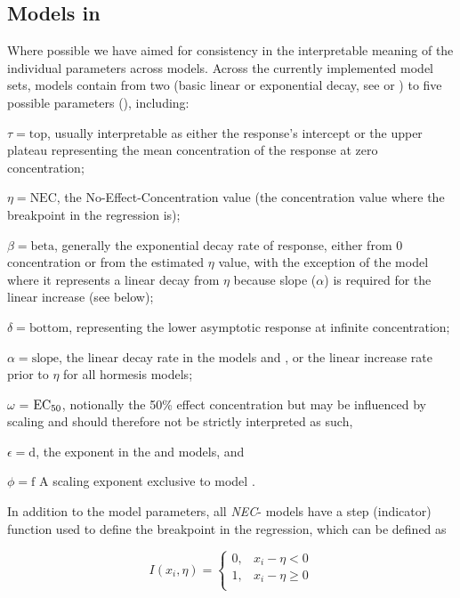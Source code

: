 \documentclass[
  shortnames]{jss}
\begin{document}
\subsection[Models in bayesnec]{Models in }\label{mdbnc}

Where possible we have aimed for consistency in the interpretable meaning of the individual parameters across models. Across the currently implemented model sets, models contain from two (basic linear or exponential decay, see  or ) to five possible parameters (), including:

\(\tau = \text{top}\), usually interpretable as either the response's intercept or the upper plateau representing the mean concentration of the response at zero concentration;

\(\eta = \text{NEC}\), the No-Effect-Concentration value (the concentration value where the breakpoint in the regression is);

\(\beta = \text{beta}\), generally the exponential decay rate of response, either from 0 concentration or from the estimated \(\eta\) value, with the exception of the  model where it represents a linear decay from \(\eta\) because slope (\(\alpha\)) is required for the linear increase (see below);

\(\delta = \text{bottom}\), representing the lower asymptotic response at infinite concentration;

\(\alpha = \text{slope}\), the linear decay rate in the models  and , or the linear increase rate prior to \(\eta\) for all hormesis models;

\(\omega\) = \(\text{EC\textsubscript{50}}\), notionally the 50\% effect concentration but may be influenced by scaling and should therefore not be strictly interpreted as such,

\(\epsilon = \text{d}\), the exponent in the  and  models, and

\(\phi = \text{f}\) A scaling exponent exclusive to model .

In addition to the model parameters, all \emph{NEC}- models have a step (indicator) function used to define the breakpoint in the regression, which can be defined as

\[
I(x_i, \eta) = \begin{cases} 
      0, & x_i - \eta < 0 \\
      1, & x_i - \eta \geq 0 \\
   \end{cases}
\]
\end{document}
